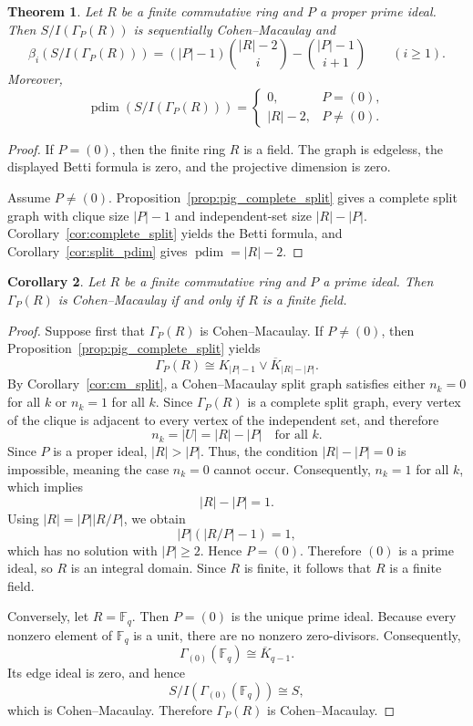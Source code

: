 \documentclass[12pt, reqno]{amsart}
\newtheorem{theorem}{Theorem}[section]
\newtheorem{corollary}[theorem]{Corollary}
\theoremstyle{definition}
\numberwithin{equation}{section}
\begin{document}
	\begin{theorem}
Let $R$ be a finite commutative ring and $P$ a proper prime ideal.  Then $S/I(\Gamma_P(R))$ is sequentially Cohen--Macaulay and
\[
\beta_i(S/I(\Gamma_P(R)))
=(|P|-1)\binom{|R|-2}{i}-\binom{|P|-1}{i+1}
\qquad(i\ge1).
\]
Moreover,
\[
\operatorname{pdim}(S/I(\Gamma_P(R)))=
\begin{cases}
0,&P=(0),\\
|R|-2,&P\ne(0).
\end{cases}
\]
\end{theorem}
\begin{proof}
If $P=(0)$, then the finite ring $R$ is a field.  The graph is edgeless, the displayed Betti formula is zero, and the projective dimension is zero.

Assume $P\ne(0)$.  Proposition~\ref{prop:pig_complete_split} gives a complete split graph with clique size $|P|-1$ and independent-set size $|R|-|P|$.  Corollary~\ref{cor:complete_split} yields the Betti formula, and Corollary~\ref{cor:split_pdim} gives $\operatorname{pdim}=|R|-2$.
\end{proof}
	
	\begin{corollary}\label{cor:cm_prime_ideal}
		Let $R$ be a finite commutative ring and $P$ a prime ideal. Then $\Gamma_P(R)$ is Cohen--Macaulay if and only if $R$ is a finite field.
	\end{corollary}
	
	\begin{proof}
		Suppose first that $\Gamma_P(R)$ is Cohen--Macaulay. If $P\neq (0)$, then Proposition~\ref{prop:pig_complete_split} yields
		\[
		\Gamma_P(R)\cong K_{|P|-1}\vee \overline{K}_{|R|-|P|}.
		\]
		By Corollary~\ref{cor:cm_split}, a Cohen--Macaulay split graph satisfies either $n_k=0$ for all $k$ or $n_k=1$ for all $k$. Since $\Gamma_P(R)$ is a complete split graph, every vertex of the clique is adjacent to every vertex of the independent set, and therefore
		\[
		n_k = |U| = |R| - |P| \quad \text{for all } k.
		\]
		Since $P$ is a proper ideal, $|R| > |P|$. Thus, the condition $|R|-|P| = 0$ is impossible, meaning the case $n_k=0$ cannot occur. Consequently, $n_k=1$ for all $k$, which implies
		\[
		|R|-|P|=1.
		\]
		Using $|R|=|P||R/P|$, we obtain
		\[
		|P|(|R/P|-1)=1,
		\]
		which has no solution with $|P|\ge 2$. Hence $P=(0)$. Therefore $(0)$ is a prime ideal, so $R$ is an integral domain. Since $R$ is finite, it follows that $R$ is a finite field.
		
		Conversely, let $R=\mathbb F_q$. Then $P=(0)$ is the unique prime ideal. Because every nonzero element of $\mathbb F_q$ is a unit, there are no nonzero zero-divisors. Consequently,
		\[
		\Gamma_{(0)}(\mathbb F_q)\cong \overline{K}_{q-1}.
		\]
		Its edge ideal is zero, and hence
		\[
		S/I(\Gamma_{(0)}(\mathbb F_q))
		\cong S,
		\]
		which is Cohen--Macaulay. Therefore $\Gamma_P(R)$ is Cohen--Macaulay.
	\end{proof}
	
\end{document}
